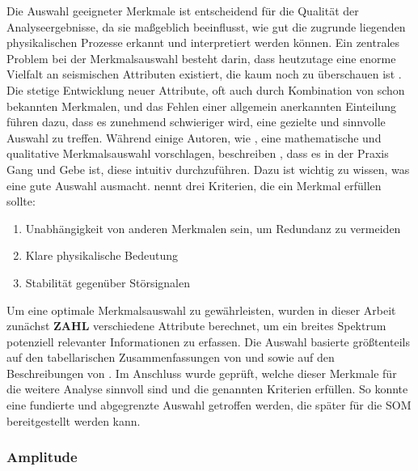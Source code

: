Die Auswahl geeigneter Merkmale ist entscheidend für die Qualität der Analyseergebnisse, da sie maßgeblich beeinflusst, wie gut die zugrunde liegenden physikalischen Prozesse erkannt und interpretiert werden können. Ein zentrales Problem bei der Merkmalsauswahl besteht darin, dass heutzutage eine enorme Vielfalt an seismischen Attributen existiert, die kaum noch zu überschauen ist \parencites{zhao_seismic_2018}{qi_seismic_2020}{barnes_too_2006}. Die stetige Entwicklung neuer Attribute, oft auch durch Kombination von schon bekannten Merkmalen, und das Fehlen einer allgemein anerkannten Einteilung \parencite{roden_geologic_2015} führen dazu, dass es zunehmend schwieriger wird, eine gezielte und sinnvolle Auswahl zu treffen. Während einige Autoren, wie \textcite{zhao_seismic_2018}, eine mathematische und qualitative Merkmalsauswahl vorschlagen, beschreiben \textcite{chopra_seismic_2007}, dass es in der Praxis Gang und Gebe ist, diese intuitiv durchzuführen. Dazu ist wichtig zu wissen, was eine gute Auswahl ausmacht. \textcite{barnes_too_2006} nennt drei Kriterien, die ein Merkmal erfüllen sollte: \\

\begin{enumerate}
    \item Unabhängigkeit von anderen Merkmalen sein, um Redundanz zu vermeiden
    \item Klare physikalische Bedeutung
    \item Stabilität gegenüber Störsignalen
\end{enumerate}
Um eine optimale Merkmalsauswahl zu gewährleisten, wurden in dieser Arbeit zunächst \textbf{ZAHL} verschiedene Attribute berechnet, um ein breites Spektrum potenziell relevanter Informationen zu erfassen. Die Auswahl basierte größtenteils auf den tabellarischen Zusammenfassungen von \textcite{roden_geologic_2015} und \textcite{barnes_too_2006} sowie auf den Beschreibungen von \textcite{chopra_seismic_2007}. Im Anschluss wurde geprüft, welche dieser Merkmale für die weitere Analyse sinnvoll sind und die genannten Kriterien erfüllen. So konnte eine fundierte und abgegrenzte Auswahl getroffen werden, die später für die SOM bereitgestellt werden kann.

\subsubsection{Amplitude}

